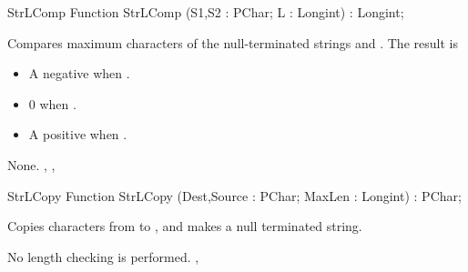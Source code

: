 \html{}
\begin{function}{StrLComp}
\Declaration
Function StrLComp (S1,S2 : PChar; L : Longint) : Longint;

\Description

Compares maximum  characters of the null-terminated strings 
 and . 
The result is 
\begin{itemize}
\item A negative  when .
\item 0 when .
\item A positive  when .
\end{itemize}

\Errors
None.
\SeeAlso
{}, , 
\end{function}
\html{}
\begin{function}{StrLCopy}
\Declaration
Function StrLCopy (Dest,Source : PChar; MaxLen : Longint) : PChar;

\Description

Copies  characters from  to , and makes
 a null terminated string. 

\Errors
No length checking is performed.
\SeeAlso
{}, 
\end{function}
 
